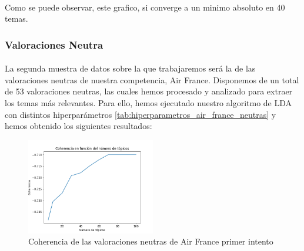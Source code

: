 \documentclass{report}
\begin{document}
                    \paragraph*{}{
                        Como se puede observar, este grafico, si converge a un minimo absoluto en 40 temas.
                    }
                \clearpage\subsubsection*{Valoraciones Neutra}
                    \paragraph*{}{
                        La segunda muestra de datos sobre la que trabajaremos será la de las valoraciones neutras de nuestra competencia, Air France.
                        Disponemos de un total de 53 valoraciones neutras, las cuales hemos procesado y analizado para extraer los temas más relevantes.
                        Para ello, hemos ejecutado nuestro algoritmo de LDA con distintos hiperparámetros \ref{tab:hiperparametros_air_france_neutras} y hemos obtenido los siguientes resultados:
                    }
                    \begin{figure}[H]
                        \centering
                        \includegraphics[width=0.5\textwidth]{./img/air_france_neutras1.png}
                        \caption{Coherencia de las valoraciones neutras de Air France primer intento}
                    \end{figure}
\end{document}
